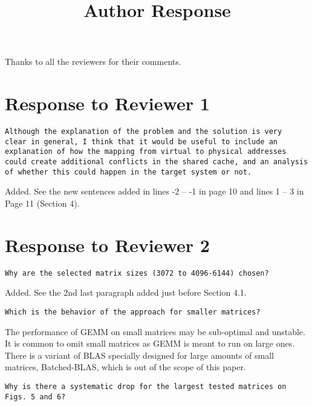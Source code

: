 \documentclass[]{article}
\begin{document}
\title{Author Response}
\date{}
\author{}



\maketitle

Thanks to all the reviewers for their comments.

\section{Response to Reviewer 1}

\begin{verbatim}
Although the explanation of the problem and the solution is very
clear in general, I think that it would be useful to include an
explanation of how the mapping from virtual to physical addresses
could create additional conflicts in the shared cache, and an analysis
of whether this could happen in the target system or not.
\end{verbatim}


Added. See the new sentences added in lines -2 -- -1 in
page 10 and lines 1 -- 3 in Page 11 (Section 4).

\section{Response to Reviewer 2}

\begin{verbatim}
Why are the selected matrix sizes (3072 to 4096-6144) chosen?
\end{verbatim}


Added. See the 2nd last paragraph added just before
Section 4.1.

\begin{verbatim}
Which is the behavior of the approach for smaller matrices?
\end{verbatim}

The performance of GEMM on small matrices may be
sub-optimal
and unstable.
It is common to omit small
matrices as GEMM is meant to run on large ones.
There is a variant of BLAS specially designed for
large amounts of small matrices,
Batched-BLAS, which is out of the scope of this paper.

\begin{verbatim}
Why is there a systematic drop for the largest tested matrices on
Figs. 5 and 6?
\end{verbatim}
\end{document}
